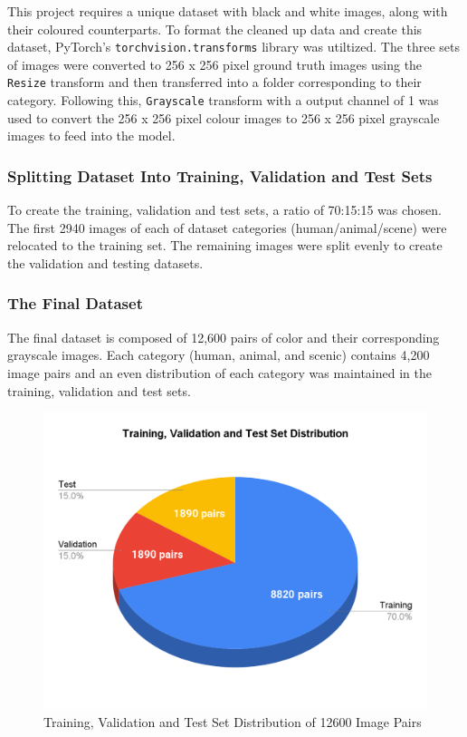 \documentclass{article} %
\begin{document}
This project requires a unique dataset with black and white images, along with their coloured counterparts. To format the cleaned up data and create this dataset, PyTorch’s \verb|torchvision.transforms| library was utiltized. The three sets of images were converted to 256 x 256 pixel ground truth images using the \verb|Resize| transform and then transferred into a folder corresponding to their category. Following this, \verb|Grayscale|
 transform with a output channel of 1 was used to convert the 256 x 256 pixel colour images to 256 x 256 pixel grayscale images to feed into the model. 

 \subsubsection{Splitting Dataset Into Training, Validation and Test Sets}

To create the training, validation and test sets, a ratio of 70:15:15 was chosen. The first 2940 images of each of dataset categories (human/animal/scene) were relocated to the training set. The remaining images were split evenly to create the validation and testing datasets. 

\subsubsection{The Final Dataset}

The final dataset is composed of 12,600 pairs of color and their corresponding grayscale images. Each category (human, animal, and scenic) contains 4,200 image pairs and an even distribution of each category was maintained in the training, validation and test sets.

\begin{figure}[htbp]            %
  \centering
  \includegraphics[width=0.9\linewidth]{Figs/dataset1.png}
  \caption{Training, Validation and Test Set Distribution of 12600 Image Pairs}
  \label{fig:dataset}
\end{figure}
\end{document}
